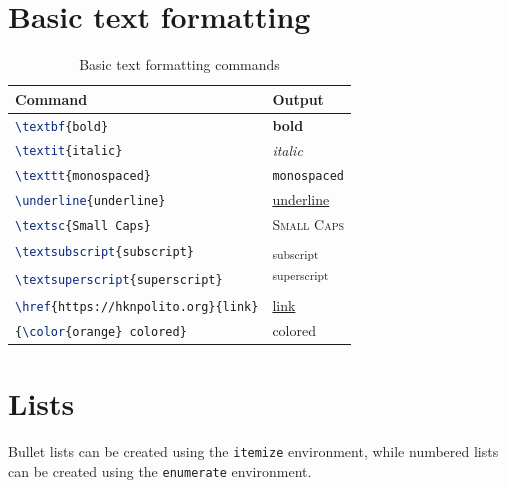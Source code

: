 \section{Basic text formatting}

\renewcommand{\arraystretch}{1.3}
\begin{table}[H]
    \centering
    \begin{tabular}{l|l}
        \textbf{Command} & \textbf{Output} \\
        \hline
        \lstinline[language=TeX]|\textbf{bold}| & \textbf{bold} \\
        \lstinline[language=TeX]|\textit{italic}| & \textit{italic} \\
        \lstinline[language=TeX]|\texttt{monospaced}| & \texttt{monospaced} \\
        \lstinline[language=TeX]|\underline{underline}| & \underline{underline} \\
        \lstinline[language=TeX]|\textsc{Small Caps}| & \textsc{Small Caps} \\
        \lstinline[language=TeX]|\textsubscript{subscript}| & \textsubscript{subscript} \\
        \lstinline[language=TeX]|\textsuperscript{superscript}| & \textsuperscript{superscript} \\
        \lstinline[language=TeX]|\href{https://hknpolito.org}{link}| & \href{https://hknpolito.org}{link} \\
        \lstinline[language=TeX]|{\color{orange} colored}| & {\color{orange} colored} \\
    \end{tabular}
    \caption{Basic text formatting commands}
\end{table}

\section{Lists}

Bullet lists can be created using the \lstinline[language=TeX]|itemize| environment, while numbered lists can be created using the \lstinline[language=TeX]|enumerate| environment.

